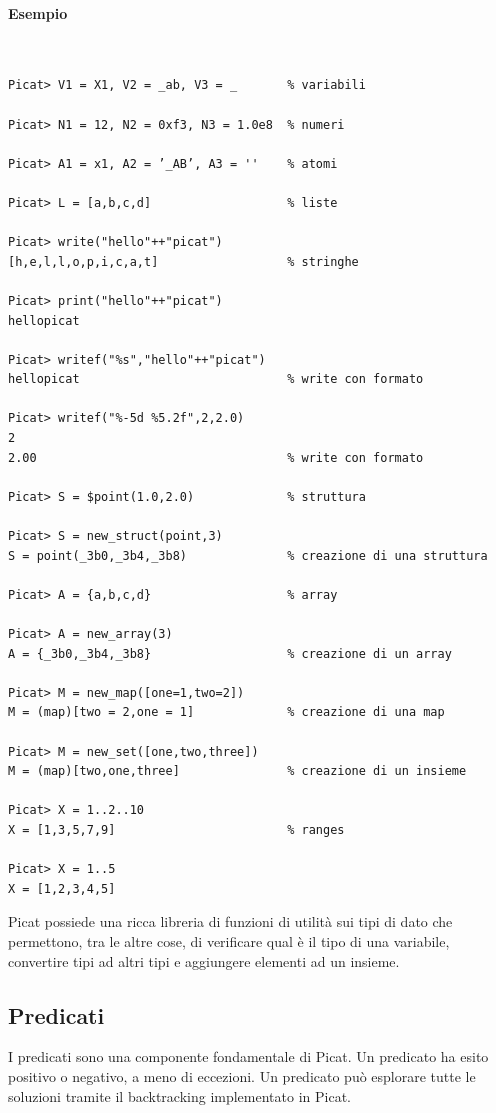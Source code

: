 \documentclass[12pt,a4paper,openright]{book} %
\begin{document}
\paragraph{Esempio}\
\begin{verbatim}
Picat> V1 = X1, V2 = _ab, V3 = _       % variabili

Picat> N1 = 12, N2 = 0xf3, N3 = 1.0e8  % numeri

Picat> A1 = x1, A2 = ’_AB’, A3 = ''    % atomi

Picat> L = [a,b,c,d]                   % liste

Picat> write("hello"++"picat")
[h,e,l,l,o,p,i,c,a,t]                  % stringhe

Picat> print("hello"++"picat")
hellopicat

Picat> writef("%s","hello"++"picat")
hellopicat                             % write con formato

Picat> writef("%-5d %5.2f",2,2.0)
2
2.00                                   % write con formato

Picat> S = $point(1.0,2.0)             % struttura

Picat> S = new_struct(point,3)
S = point(_3b0,_3b4,_3b8)              % creazione di una struttura

Picat> A = {a,b,c,d}                   % array

Picat> A = new_array(3)
A = {_3b0,_3b4,_3b8}                   % creazione di un array

Picat> M = new_map([one=1,two=2])
M = (map)[two = 2,one = 1]             % creazione di una map

Picat> M = new_set([one,two,three])
M = (map)[two,one,three]               % creazione di un insieme

Picat> X = 1..2..10
X = [1,3,5,7,9]                        % ranges

Picat> X = 1..5
X = [1,2,3,4,5]
\end{verbatim}

Picat possiede una ricca libreria di funzioni di utilità sui tipi di
dato che permettono, tra le altre cose, di verificare qual è il tipo
di una variabile, convertire tipi ad altri tipi e aggiungere elementi
ad un insieme.

\subsection{Predicati}
\label{subsec:picat_base_pred}

I predicati sono una componente fondamentale di Picat. Un predicato ha
esito positivo o negativo, a meno di eccezioni. Un predicato può
esplorare tutte le soluzioni tramite il backtracking implementato in
Picat.
\end{document}
